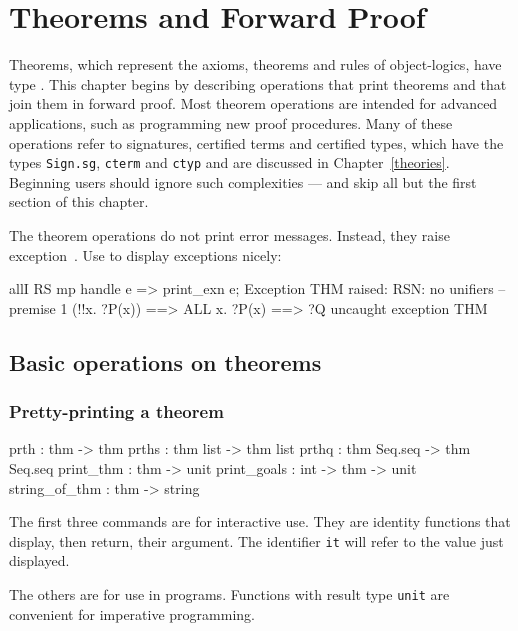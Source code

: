 \chapter{Theorems and Forward Proof}

Theorems, which represent the axioms, theorems and rules of
object-logics, have type .  This chapter begins by
describing operations that print theorems and that join them in
forward proof.  Most theorem operations are intended for advanced
applications, such as programming new proof procedures.  Many of these
operations refer to signatures, certified terms and certified types,
which have the \ML{} types {\tt Sign.sg}, {\tt cterm} and {\tt ctyp}
and are discussed in Chapter~\ref{theories}.  Beginning users should
ignore such complexities --- and skip all but the first section of
this chapter.

The theorem operations do not print error messages.  Instead, they raise
exception~\@.  Use  to display
exceptions nicely:
\begin{ttbox} 
allI RS mp  handle e => print_exn e;
{\out Exception THM raised:}
{\out RSN: no unifiers -- premise 1}
{\out (!!x. ?P(x)) ==> ALL x. ?P(x)}
{\out [| ?P --> ?Q; ?P |] ==> ?Q}
{\out}
{\out uncaught exception THM}
\end{ttbox}


\section{Basic operations on theorems}
\subsection{Pretty-printing a theorem}
\begin{ttbox} 
prth          : thm -> thm
prths         : thm list -> thm list
prthq         : thm Seq.seq -> thm Seq.seq
print_thm     : thm -> unit
print_goals   : int -> thm -> unit
string_of_thm : thm -> string
\end{ttbox}
The first three commands are for interactive use.  They are identity
functions that display, then return, their argument.  The \ML{} identifier
{\tt it} will refer to the value just displayed.

The others are for use in programs.  Functions with result type {\tt unit}
are convenient for imperative programming.

